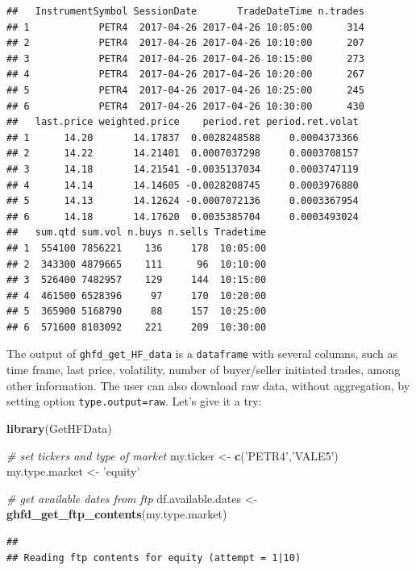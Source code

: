 \documentclass[11pt,]{book}
\newenvironment{Shaded}{\begin{snugshade}}{\end{snugshade}}
\newcommand{\KeywordTok}[1]{\textcolor[rgb]{0.27,0.27,0.27}{\textbf{#1}}}
\newcommand{\StringTok}[1]{\textcolor[rgb]{0.5,0.5,0.5}{#1}}
\newcommand{\CommentTok}[1]{\textcolor[rgb]{0.56,0.35,0.01}{\textit{#1}}}
\newcommand{\NormalTok}[1]{#1}
\begin{document}
\begin{verbatim}
##   InstrumentSymbol SessionDate       TradeDateTime n.trades
## 1            PETR4  2017-04-26 2017-04-26 10:05:00      314
## 2            PETR4  2017-04-26 2017-04-26 10:10:00      207
## 3            PETR4  2017-04-26 2017-04-26 10:15:00      273
## 4            PETR4  2017-04-26 2017-04-26 10:20:00      267
## 5            PETR4  2017-04-26 2017-04-26 10:25:00      245
## 6            PETR4  2017-04-26 2017-04-26 10:30:00      430
##   last.price weighted.price    period.ret period.ret.volat
## 1      14.20       14.17837  0.0028248588     0.0004373366
## 2      14.22       14.21401  0.0007037298     0.0003708157
## 3      14.18       14.21541 -0.0035137034     0.0003747119
## 4      14.14       14.14605 -0.0028208745     0.0003976880
## 5      14.13       14.12624 -0.0007072136     0.0003367954
## 6      14.18       14.17620  0.0035385704     0.0003493024
##   sum.qtd sum.vol n.buys n.sells Tradetime
## 1  554100 7856221    136     178  10:05:00
## 2  343300 4879665    111      96  10:10:00
## 3  526400 7482957    129     144  10:15:00
## 4  461500 6528396     97     170  10:20:00
## 5  365900 5168790     88     157  10:25:00
## 6  571600 8103092    221     209  10:30:00
\end{verbatim}

The output of \texttt{ghfd\_get\_HF\_data} is a \texttt{dataframe} with
several columns, such as time frame, last price, volatility, number of
buyer/seller initiated trades, among other information. The user can
also download raw data, without aggregation, by setting option
\texttt{type.output=\textquotesingle{}raw\textquotesingle{}}. Let's give
it a try:

\begin{Shaded}
\begin{Highlighting}[]
\KeywordTok{library}\NormalTok{(GetHFData)}

\CommentTok{# set tickers and type of market}
\NormalTok{my.ticker <-}\StringTok{ }\KeywordTok{c}\NormalTok{(}\StringTok{'PETR4'}\NormalTok{,}\StringTok{'VALE5'}\NormalTok{)}
\NormalTok{my.type.market <-}\StringTok{ 'equity'}

\CommentTok{# get available dates from ftp}
\NormalTok{df.available.dates <-}\StringTok{ }\KeywordTok{ghfd_get_ftp_contents}\NormalTok{(my.type.market)}
\end{Highlighting}
\end{Shaded}

\begin{verbatim}
## 
## Reading ftp contents for equity (attempt = 1|10)
\end{verbatim}
\end{document}
